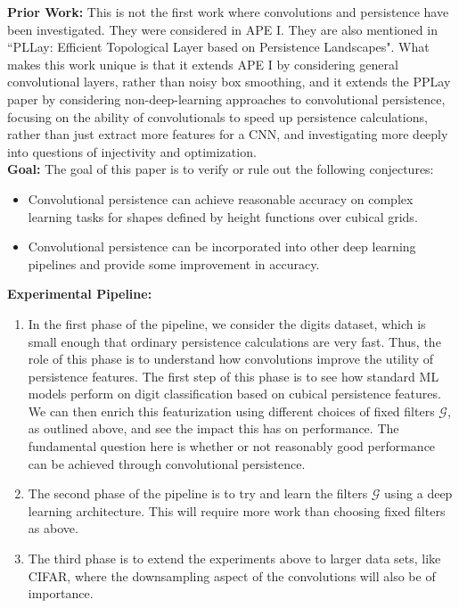 \documentclass[12pt]{amsart}
\numberwithin{figure}{section}
\begin{document}
  
{\bf Prior Work:} This is not the first work where convolutions and persistence have been investigated. They were considered in APE I. They are also mentioned in ``PLLay: Efficient Topological Layer based on Persistence Landscapes". What makes this work unique is that it extends APE I by considering general convolutional layers, rather than noisy box smoothing, and it extends the PPLay paper by considering non-deep-learning approaches to convolutional persistence, focusing on the ability of convolutionals to speed up persistence calculations, rather than just extract more features for a CNN, and investigating more deeply into questions of injectivity and optimization.\\

{\bf Goal:} The goal of this paper is to verify or rule out the following conjectures: 
\begin{itemize}
	\item Convolutional persistence can achieve reasonable accuracy on complex learning tasks for shapes defined by height functions over cubical grids.
	\item Convolutional persistence can be incorporated into other deep learning pipelines and provide some improvement in accuracy.
\end{itemize}


{\bf Experimental Pipeline:}
\begin{enumerate}
	\item In the first phase of the pipeline, we consider the digits dataset, which is small enough that ordinary persistence calculations are very fast. Thus, the role of this phase is to understand how convolutions improve the utility of persistence features. The first step of this phase is to see how standard ML models perform on digit classification based on cubical persistence features. We can then enrich this featurization using different choices of fixed filters $\mathcal{G}$, as outlined above, and see the impact this has on performance. The fundamental question here is whether or not reasonably good performance can be achieved through convolutional persistence. 
	\item The second phase of the pipeline is to try and learn the filters $\mathcal{G}$ using a deep learning architecture. This will require more work than choosing fixed filters as above.
	\item The third phase is to extend the experiments above to larger data sets, like CIFAR, where the downsampling aspect of the convolutions will also be of importance.
\end{enumerate}
\end{document}
